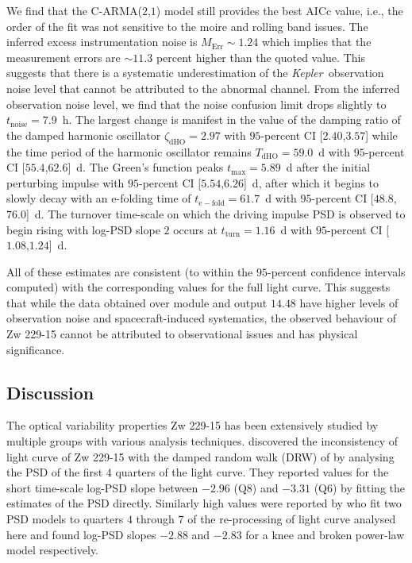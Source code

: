 \documentclass[a4paper,fleqn,usenatbib]{mnras}
\newcommand{\Kepler}{\textit{Kepler~}}
\begin{document}
We find that the C-ARMA($2$,$1$) model still provides the best AICc value, i.e., the order of the fit was not sensitive to the moire and rolling band issues. The inferred excess instrumentation noise is $M_{\mathrm{Err}} \sim 1.24$ which implies that the measurement errors are $\sim 11.3$ percent higher than the quoted value. This suggests that there is a systematic underestimation of the \Kepler observation noise level that cannot be attributed to the abnormal channel. From the inferred observation noise level, we find that the noise confusion limit drops slightly to $t_{\mathrm{noise}} = 7.9$~h. The largest change is manifest in the value of the damping ratio of the damped harmonic oscillator $\zeta_{\mathrm{dHO}} = 2.97$ with $95$-percent CI [$2.40$,$3.57$] while the time period of the harmonic oscillator remains $T_{\mathrm{dHO}} = 59.0$~d with $95$-percent CI [$55.4$,$62.6$]~d. The Green's function peaks $t_{\mathrm{max}} = 5.89$~d after the initial perturbing impulse with $95$-percent CI [$5.54$,$6.26$]~d, after which it begins to slowly decay with an e-folding time of $t_{\mathrm{e-fold}} = 61.7$~d with $95$-percent CI [$48.8$,$76.0$]~d. The turnover time-scale on which the driving impulse PSD is observed to begin rising with log-PSD slope $2$ occurs at $t_{\mathrm{turn}} = 1.16$~d with $95$-percent CI [$1.08$,$1.24$]~d.

All of these estimates are consistent (to within the $95$-percent confidence intervals computed) with the corresponding values for the full light curve. This suggests that while the data obtained over module and output $14$.$48$ have higher levels of observation noise and spacecraft-induced systematics, the observed behaviour of Zw 229-15 cannot be attributed to observational issues and has physical significance.

\subsection[Discussion]{Discussion}\label{sec:Compare}

The optical variability properties Zw 229-15 has been extensively studied by multiple groups with various analysis techniques. \citet{Mushotzky11} discovered the inconsistency of light curve of Zw 229-15 with the damped random walk (DRW) of \citet{Kelly09} by analysing the PSD of the first $4$ quarters of the light curve. They reported values for the short time-scale log-PSD slope between $-2.96$ (Q$8$) and $-3.31$ (Q$6$) by fitting the estimates of the PSD directly. Similarly high values were reported by \citet{Carini12} who fit two PSD models to quarters $4$ through $7$ of the re-processing of light curve analysed here and found log-PSD slopes $-2.88$ and $-2.83$ for a knee and broken power-law model respectively.
\end{document}
